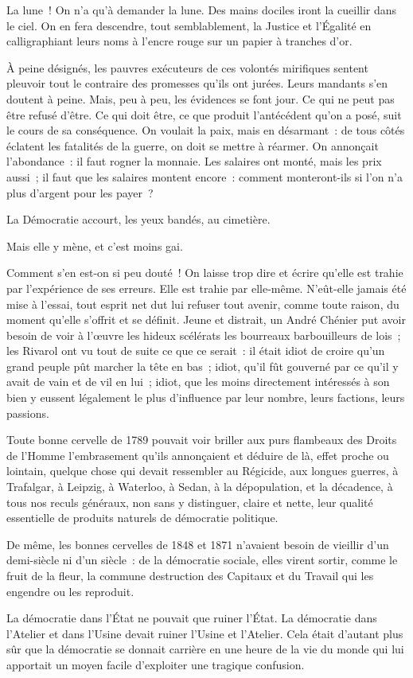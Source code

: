 \documentclass[french,twoside]{book} %
\begin{document}
La lune ! On n’a qu’à demander la lune. Des mains dociles iront la cueillir dans le ciel. On en fera descendre, tout semblablement, la Justice et l’Égalité en calligraphiant leurs noms à l’encre rouge sur un papier à tranches d’or.\par
À peine désignés, les pauvres exécuteurs de ces volontés mirifiques sentent pleuvoir tout le contraire des promesses qu’ils ont jurées. Leurs mandants s’en doutent à peine. Mais, peu à peu, les évidences se font jour. Ce qui ne peut pas être refusé d’être. Ce qui doit être, ce que produit l’antécédent qu’on a posé, suit le cours de sa conséquence. On voulait la paix, mais en désarmant : de tous côtés éclatent les fatalités de la guerre, on doit se mettre à réarmer. On annonçait l’abondance : il faut rogner la monnaie. Les salaires ont monté, mais les prix aussi ; il faut que les salaires montent encore : comment monteront-ils si l’on n’a plus d’argent pour les payer ?\par
La Démocratie accourt, les yeux bandés, au cimetière.\par
Mais elle y mène, et c’est moins gai.\par
Comment s’en est-on si peu douté ! On laisse trop dire et écrire qu’elle est trahie par l’expérience de ses erreurs. Elle est trahie par elle-même. N’eût-elle jamais été mise à l’essai, tout esprit net dut lui refuser tout avenir, comme toute raison, du moment qu’elle s’offrit et se définit. Jeune et distrait, un André Chénier put avoir besoin de voir à l’œuvre les hideux scélérats les bourreaux barbouilleurs de lois ; les Rivarol ont vu tout de suite ce que ce serait : il était idiot de croire qu’un grand peuple pût marcher la tête en bas ; idiot, qu’il fût gouverné par ce qu’il y avait de vain et de vil en lui ; idiot, que les moins directement intéressés à son bien y eussent légalement le plus d’influence par leur nombre, leurs factions, leurs passions.\par
Toute bonne cervelle de 1789 pouvait voir briller aux purs flambeaux des Droits de l’Homme l’embrasement qu’ils annonçaient et déduire de là, effet proche ou lointain, quelque chose qui devait ressembler au Régicide, aux longues guerres, à Trafalgar, à Leipzig, à Waterloo, à Sedan, à la dépopulation, et la décadence, à tous nos reculs généraux, non sans y distinguer, claire et nette, leur qualité essentielle de produits naturels de démocratie politique.\par
De même, les bonnes cervelles de 1848 et 1871 n’avaient besoin de vieillir d’un demi-siècle ni d’un siècle : de la démocratie sociale, elles virent sortir, comme le fruit de la fleur, la commune destruction des Capitaux et du Travail qui les engendre ou les reproduit.\par
La démocratie dans l’État ne pouvait que ruiner l’État. La démocratie dans l’Atelier et dans l’Usine devait ruiner l’Usine et l’Atelier. Cela était d’autant plus sûr que la démocratie se donnait carrière en une heure de la vie du monde qui lui apportait un moyen facile d’exploiter une tragique confusion.
\end{document}
